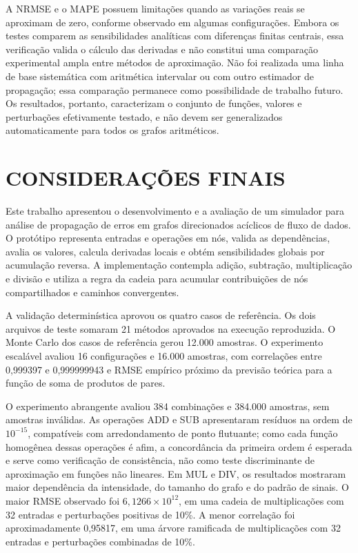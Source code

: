 \documentclass[12pt,openright,oneside,a4paper,brazil]{abntex2}
\begin{document}
A NRMSE e o MAPE possuem limitações quando as variações reais se aproximam de zero, conforme observado em algumas configurações. Embora os testes comparem as sensibilidades analíticas com diferenças finitas centrais, essa verificação valida o cálculo das derivadas e não constitui uma comparação experimental ampla entre métodos de aproximação. Não foi realizada uma linha de base sistemática com aritmética intervalar ou com outro estimador de propagação; essa comparação permanece como possibilidade de trabalho futuro. Os resultados, portanto, caracterizam o conjunto de funções, valores e perturbações efetivamente testado, e não devem ser generalizados automaticamente para todos os grafos aritméticos.

\chapter{CONSIDERAÇÕES FINAIS}

Este trabalho apresentou o desenvolvimento e a avaliação de um simulador para análise de propagação de erros em grafos direcionados acíclicos de fluxo de dados. O protótipo representa entradas e operações em nós, valida as dependências, avalia os valores, calcula derivadas locais e obtém sensibilidades globais por acumulação reversa. A implementação contempla adição, subtração, multiplicação e divisão e utiliza a regra da cadeia para acumular contribuições de nós compartilhados e caminhos convergentes.

A validação determinística aprovou os quatro casos de referência. Os dois arquivos de teste somaram 21 métodos aprovados na execução reproduzida. O Monte Carlo dos casos de referência gerou 12.000 amostras. O experimento escalável avaliou 16 configurações e 16.000 amostras, com correlações entre 0,999397 e 0,999999943 e RMSE empírico próximo da previsão teórica para a função de soma de produtos de pares.

O experimento abrangente avaliou 384 combinações e 384.000 amostras, sem amostras inválidas. As operações ADD e SUB apresentaram resíduos na ordem de $10^{-15}$, compatíveis com arredondamento de ponto flutuante; como cada função homogênea dessas operações é afim, a concordância da primeira ordem é esperada e serve como verificação de consistência, não como teste discriminante de aproximação em funções não lineares. Em MUL e DIV, os resultados mostraram maior dependência da intensidade, do tamanho do grafo e do padrão de sinais. O maior RMSE observado foi $6{,}1266\times10^{12}$, em uma cadeia de multiplicações com 32 entradas e perturbações positivas de 10\%. A menor correlação foi aproximadamente 0,95817, em uma árvore ramificada de multiplicações com 32 entradas e perturbações combinadas de 10\%.
\end{document}
